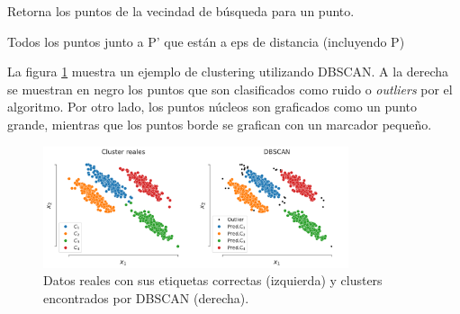 \begin{algorithm}[H]
  \caption{Retorna los puntos de la vecindad de búsqueda para un punto.
    \label{alg:regionDeConsulta}}
  \begin{algorithmic}[1]
    
    \Return Todos los puntos junto a P' que están a eps de distancia (incluyendo P)
    \EndFunction
  \end{algorithmic}
\end{algorithm}

La figura \ref{fig:dbscan} muestra un ejemplo de clustering utilizando DBSCAN. A la derecha se muestran en negro los puntos que son clasificados como ruido o \emph{outliers} por el algoritmo. Por otro lado, los puntos núcleos son graficados como un punto grande, mientras que los puntos borde se grafican con un marcador pequeño.

\begin{figure}[H]
  \centering
  \includegraphics[width=0.8\textwidth]{img/cap6_dbscan}
  \caption{Datos reales con sus etiquetas correctas (izquierda) y clusters encontrados por DBSCAN (derecha).}
  \label{fig:dbscan}
\end{figure}
